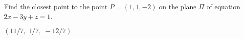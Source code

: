 
\begin{Exercise}[
name={},
title={}, 
difficulty=0,
origin={\cite{AG}}]
Find the closest point to the point $P=(1,1,-2)$ on the plane $\Pi$ of equation $2x-3y+z=1$.
\end{Exercise}

\begin{Answer}
$(11/7,\;1/7,\;-12/7)$
\end{Answer}
